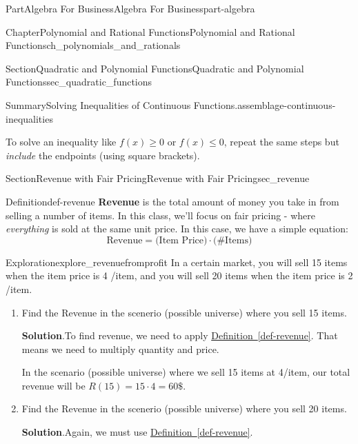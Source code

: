 \documentclass{tufte-book}
\newcommand{\blocktitlefont}{\relax}
\newcommand{\xreffont}{\relax}
\newcommand{\terminology}[1]{\textbf{#1}}
\numberwithin{equation}{chapter}
\begin{document}
\begin{partptx}{Part}{Algebra For Business}{}{Algebra For Business}{}{}{part-algebra}
\begin{chapterptx}{Chapter}{Polynomial and Rational Functions}{}{Polynomial and Rational Functions}{}{}{ch_polynomials_and_rationals}
\begin{sectionptx}{Section}{Quadratic and Polynomial Functions}{}{Quadratic and Polynomial Functions}{}{}{sec_quadratic_functions}
\begin{assemblage}{Summary}{Solving Inequalities of Continuous Functions.}{assemblage-continuous-inequalities}
\begin{enumerate}
\end{enumerate}
%
\par
To solve an inequality like \(f(x)\geq 0\) or \(f(x)\leq 0\), repeat the same steps but \emph{include} the endpoints (using square brackets).%
\end{assemblage}
\end{sectionptx}
%
%
\typeout{************************************************}
\typeout{************************************************}
%
\begin{sectionptx}{Section}{Revenue with Fair Pricing}{}{Revenue with Fair Pricing}{}{}{sec_revenue}
\begin{definition}{Definition}{}{def-revenue}%
\terminology{Revenue} is the total amount of money you take in from selling a number of items. In this class, we'll focus on fair pricing - where \emph{everything} is sold at the same unit price. In this case, we have a simple equation:%
\begin{equation*}
\text{Revenue} = \Big(\text{Item Price}\Big) \cdot \Big(\text{\# Items}\Big)
\end{equation*}
%
\end{definition}
\begin{exploration}{Exploration}{}{explore_revenuefromprofit}%
In a certain market, you will sell 15 items when the item price is 4 \textdollar{}\slash{}item, and you will sell 20 items when the item price is 2 \textdollar{}\slash{}item.%
\begin{enumerate}[font=\bfseries,label=(\alph*),ref=\alph*]%
\item{}Find the Revenue in the scenerio (possible universe) where you sell 15 items.%
\par\smallskip%
\noindent\textbf{\blocktitlefont Solution}.\hypertarget{explore_revenuefromprofit-2-2}{}\quad{}To find revenue, we need to apply \hyperref[def-revenue]{Definition~{\xreffont\ref{def-revenue}}}.  That means we need to multiply quantity and price.%
\par
In the scenario (possible universe) where we sell 15 items at 4\textdollar{}\slash{}item, our total revenue will be \(R(15) = 15\cdot 4 = 60\$\).%
\item{}Find the Revenue in the scenerio (possible universe) where you sell 20 items.%
\par\smallskip%
\noindent\textbf{\blocktitlefont Solution}.\hypertarget{explore_revenuefromprofit-3-2}{}\quad{}Again, we must use \hyperref[def-revenue]{Definition~{\xreffont\ref{def-revenue}}}.%

\end{enumerate}
\end{exploration}
\end{sectionptx}
\end{chapterptx}
\end{partptx}
\end{document}
